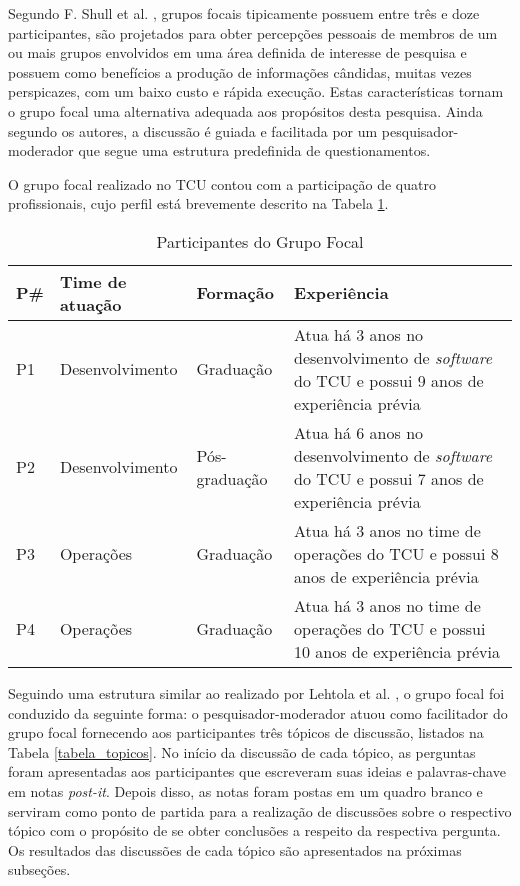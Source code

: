 Segundo F. Shull et al. \cite{shull2007guide}, grupos focais tipicamente
possuem entre três e doze participantes, são projetados para obter percepções
pessoais de membros de um ou mais grupos envolvidos em uma área definida de
interesse de pesquisa e possuem como benefícios a produção de informações
cândidas, muitas vezes perspicazes, com um baixo custo e rápida execução.
Estas características tornam o grupo focal uma alternativa adequada aos
propósitos desta pesquisa. Ainda segundo os autores, a discussão é guiada e
facilitada por um pesquisador-moderador que segue uma estrutura predefinida
de questionamentos.

O grupo focal realizado no \acrshort{TCU} contou com a participação de quatro
profissionais, cujo perfil está brevemente descrito na Tabela \ref{tabela_participantes_grupo_focal}.

\begin{table}[hb!]
\centering
\label{tabela_participantes_grupo_focal}
\begin{tabular}{|p{0.7cm}|p{3.5cm}|p{2.8cm}|p{6.5cm}|} \hline
{\bf P\#} & {\bf Time de atuação} & {\bf Formação} & {\bf Experiência}\\ \hline
P1 & Desenvolvimento & Graduação & Atua há 3 anos no desenvolvimento de {\it software} do \acrshort{TCU} e possui 9 anos de experiência prévia \\ \hline
P2 & Desenvolvimento & Pós-graduação & Atua há 6 anos no desenvolvimento de {\it software} do \acrshort{TCU} e possui 7 anos de experiência prévia \\ \hline
P3 & Operações & Graduação & Atua há 3 anos no time de operações do \acrshort{TCU} e possui 8 anos de experiência prévia \\ \hline
P4 & Operações & Graduação & Atua há 3 anos no time de operações do \acrshort{TCU} e possui 10 anos de experiência prévia \\ \hline
\end{tabular}
\caption{Participantes do Grupo Focal}
\end{table}

Seguindo uma estrutura similar ao realizado por Lehtola et al. \cite{requirementes_priorization_in_practice},
o grupo focal foi conduzido da seguinte forma: o pesquisador-moderador atuou
como facilitador do grupo focal fornecendo aos participantes três tópicos de
discussão, listados na Tabela \ref{tabela_topicos}. No início da discussão de
cada tópico, as perguntas foram apresentadas aos participantes que escreveram
suas ideias e palavras-chave em notas {\it post-it}. Depois disso, as notas
foram postas em um quadro branco e serviram como ponto de partida para a
realização de discussões sobre o respectivo tópico com o propósito de se obter
conclusões a respeito da respectiva pergunta. Os resultados das discussões de
cada tópico são apresentados na próximas subseções.

